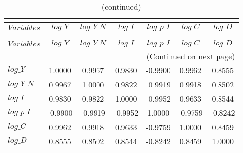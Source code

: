  
\begin{center}
\begin{longtable}{lcccccc} 
\caption{MATRIX OF CORRELATIONS}\\
 \label{Table:th_corr_matrix}\\
\toprule 
$Variables  $	 & 	 $      log\_Y$	 & 	 $  log\_Y\_N$	 & 	 $      log\_I$	 & 	 $  log\_p\_I$	 & 	 $      log\_C$	 & 	 $      log\_D$\\
\midrule \endfirsthead 
\caption{(continued)}\\
 \toprule \\ 
$Variables  $	 & 	 $      log\_Y$	 & 	 $  log\_Y\_N$	 & 	 $      log\_I$	 & 	 $  log\_p\_I$	 & 	 $      log\_C$	 & 	 $      log\_D$\\
\midrule \endhead 
\midrule \multicolumn{7}{r}{(Continued on next page)} \\ \bottomrule \endfoot 
\bottomrule \endlastfoot 
$log\_Y     $	 & 	       1.0000	 & 	       0.9967	 & 	       0.9830	 & 	      -0.9900	 & 	       0.9962	 & 	       0.8555 \\ 
$log\_Y\_N  $	 & 	       0.9967	 & 	       1.0000	 & 	       0.9822	 & 	      -0.9919	 & 	       0.9918	 & 	       0.8502 \\ 
$log\_I     $	 & 	       0.9830	 & 	       0.9822	 & 	       1.0000	 & 	      -0.9952	 & 	       0.9633	 & 	       0.8544 \\ 
$log\_p\_I  $	 & 	      -0.9900	 & 	      -0.9919	 & 	      -0.9952	 & 	       1.0000	 & 	      -0.9759	 & 	      -0.8242 \\ 
$log\_C     $	 & 	       0.9962	 & 	       0.9918	 & 	       0.9633	 & 	      -0.9759	 & 	       1.0000	 & 	       0.8459 \\ 
$log\_D     $	 & 	       0.8555	 & 	       0.8502	 & 	       0.8544	 & 	      -0.8242	 & 	       0.8459	 & 	       1.0000 \\ 
\end{longtable}
 \end{center}
